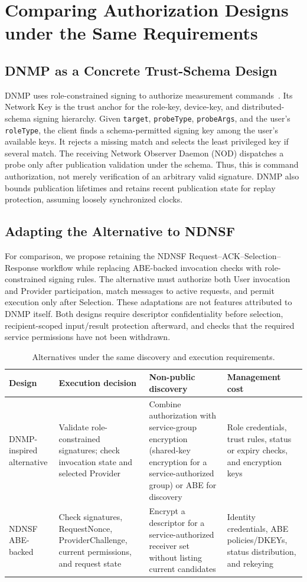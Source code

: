 \section{Comparing Authorization Designs under the Same Requirements}
\subsection{DNMP as a Concrete Trust-Schema Design}
DNMP uses role-constrained
signing to authorize measurement commands~\cite{dnmp}. Its Network Key is the
trust anchor for the role-key, device-key, and distributed-schema signing hierarchy.
Given \texttt{target}, \texttt{probeType}, \texttt{probeArgs}, and the user's
\texttt{roleType}, the client finds a schema-permitted signing key among the
user's available keys. It rejects a missing match and selects the least
privileged key if several match. The receiving Network Observer Daemon (NOD)
dispatches a probe only after publication validation under the schema.
Thus, this is command authorization, not merely verification of an arbitrary
valid signature. DNMP also bounds publication lifetimes and retains recent
publication state for replay protection, assuming loosely synchronized clocks.

\subsection{Adapting the Alternative to NDNSF}
\label{sec:dnmp-alternative}
For comparison, we propose retaining the NDNSF Request--ACK--Selection--Response
workflow while replacing ABE-backed invocation checks with role-constrained
signing rules. The alternative must authorize both User invocation and Provider
participation, match messages to active requests, and permit execution only
after Selection. These adaptations are not features attributed to DNMP itself.
Both designs require descriptor confidentiality before selection, recipient-scoped
input/result protection afterward, and checks that the required service permissions have not been withdrawn.

\begin{table}[htbp]
\centering\small
\caption{Alternatives under the same discovery and execution requirements.}
\begin{tabularx}{\textwidth}{p{}XXX}
\toprule
Design & Execution decision & Non-public discovery & Management cost\\\midrule
DNMP-inspired alternative & Validate role-constrained signatures; check invocation state and selected Provider & Combine authorization with service-group encryption (shared-key encryption for a service-authorized group) or ABE for discovery & Role credentials, trust rules, status or expiry checks, and encryption keys\\\midrule
NDNSF ABE-backed & Check signatures, RequestNonce, ProviderChallenge, current permissions, and request state & Encrypt a descriptor for a service-authorized receiver set without listing current candidates & Identity credentials, ABE policies/DKEYs, status distribution, and rekeying\\\bottomrule
\end{tabularx}
\end{table}

